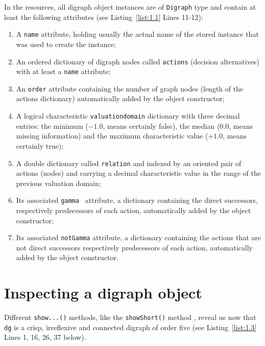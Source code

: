 In the \Digraph resources, all digraph object instances are of \texttt{Digraph} type and contain at least the following attributes (see Listing~\vref{list:1.1}  Lines 11-12):
\begin{enumerate}[leftmargin=0.5cm,listparindent=0em,nosep]
\item A \texttt{name} attribute, holding usually the actual name of the stored instance that was used to create the instance;
\item An ordered dictionary of digraph nodes called \texttt{actions} (decision alternatives) with at least a \texttt{name} attribute;
\item An \texttt{order} attribute containing the number of graph nodes (length of the actions dictionary) automatically added by the object constructor;
\item  A logical characteristic \texttt{valuationdomain} dictionary with three decimal entries: the minimum ($-1.0$, means certainly false), the median ($0.0$, means missing information) and the maximum characteristic value ($+1.0$, means certainly true);
\item A double dictionary called \texttt{relation} and indexed by an oriented pair of actions (nodes) and carrying a decimal characteristic value in the range of the previous valuation domain;
\item Its associated \texttt{gamma } attribute, a dictionary containing the direct successors, respectively predecessors of each action, automatically added by the object constructor;
\item Its associated \texttt{notGamma} attribute, a dictionary containing the actions that are not direct successors respectively predecessors of each action, automatically added by the object constructor.
\end{enumerate}

\section{Inspecting a digraph object}
\label{sec:1.4}

Different \texttt{show...()} methods, like the \texttt{showShort()} method , reveal us now that \texttt{dg} is a crisp, irreflexive and connected digraph of order five (see Listing~\vref{list:1.3}  Lines 1, 16, 26, 37 below).

